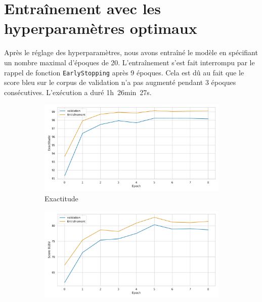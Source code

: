 \section{Entraînement avec les hyperparamètres optimaux}%
\label{sec.results.retrain}

Après le réglage des hyperparamètres, nous avons entraîné le modèle en spécifiant un nombre maximal d'époques de 20.
L'entraînement s'est fait interrompu par le rappel de fonction \verb|EarlyStopping| après 9 époques.
Cela est dû au fait que le score \gls{bleu} sur le corpus de validation n'a pas augmenté pendant 3 époques consécutives.
L'exécution a duré 1h~26min~27s.

\begin{figure}[hbt]
    \begin{subfigure}{.5\textwidth}
        \caption{Exactitude}
        \begin{center}
            \includegraphics[width=\textwidth]{assets/python/tuned-accuracy.pdf}
        \end{center}
        \label{fig.results.tuned.training.accuracy}
    \end{subfigure}
    \begin{subfigure}{.5\textwidth}
        \caption{}
        \begin{center}
            \includegraphics[width=\textwidth]{assets/python/tuned-bleu.pdf}

\end{center}
\end{subfigure}
\end{figure}
